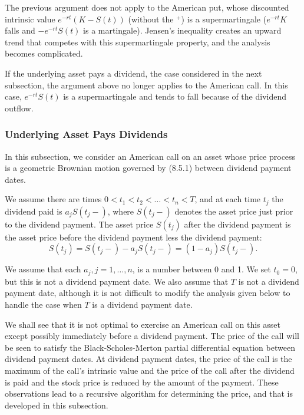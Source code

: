 The previous argument does not apply to the American put, whose discounted intrinsic value $e^{-rt}(K - S(t))$ (without the $^+$) is a supermartingale ($e^{-rt}K$ falls and $-e^{-rt}S(t)$ is a martingale). Jensen's inequality creates an upward trend that competes with this supermartingale property, and the analysis becomes complicated.

If the underlying asset pays a dividend, the case considered in the next subsection, the argument above no longer applies to the American call. In this case, $e^{-rt}S(t)$ is a supermartingale and tends to fall because of the dividend outflow.

\subsubsection{Underlying Asset Pays Dividends}

In this subsection, we consider an American call on an asset whose price process is a geometric Brownian motion governed by (8.5.1) between dividend payment dates.

We assume there are times $0 < t_1 < t_2 < \dots < t_n < T$, and at each time $t_j$ the dividend paid is $a_j S(t_j-)$, where $S(t_j-)$ denotes the asset price just prior to the dividend payment. The asset price $S(t_j)$ after the dividend payment is the asset price before the dividend payment less the dividend payment:
\begin{equation}
	S(t_j) = S(t_j-) - a_j S(t_j-) = (1 - a_j)S(t_j-). \label{eq:DividendAdjustment}
\end{equation}

We assume that each $a_j, j=1,\dots,n$, is a number between 0 and 1. We set $t_0 = 0$, but this is not a dividend payment date. We also assume that $T$ is not a dividend payment date, although it is not difficult to modify the analysis given below to handle the case when $T$ is a dividend payment date.

We shall see that it is not optimal to exercise an American call on this asset except possibly immediately before a dividend payment. The price of the call will be seen to satisfy the Black-Scholes-Merton partial differential equation between dividend payment dates. At dividend payment dates, the price of the call is the maximum of the call's intrinsic value and the price of the call after the dividend is paid and the stock price is reduced by the amount of the payment. These observations lead to a recursive algorithm for determining the price, and that is developed in this subsection.

